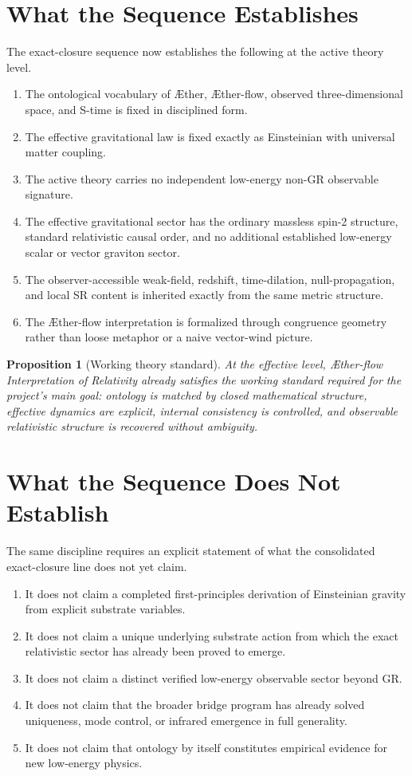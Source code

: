 \documentclass[11pt]{article}
\newcommand{\Aether}{\AE{}ther}
\newcommand{\Aflow}{\AE{}ther-flow}
\newcommand{\TheoryName}{\Aflow{} Interpretation of Relativity}
\newtheorem{proposition}{Proposition}
\begin{document}
\section{What the Sequence Establishes}

The exact-closure sequence now establishes the following at the active theory level.
\begin{enumerate}
    \item The ontological vocabulary of \Aether{}, \Aflow{}, observed three-dimensional space, and S-time is fixed in disciplined form.
    \item The effective gravitational law is fixed exactly as Einsteinian with universal matter coupling.
    \item The active theory carries no independent low-energy non-GR observable signature.
    \item The effective gravitational sector has the ordinary massless spin-2 structure, standard relativistic causal order, and no additional established low-energy scalar or vector graviton sector.
    \item The observer-accessible weak-field, redshift, time-dilation, null-propagation, and local SR content is inherited exactly from the same metric structure.
    \item The \Aflow{} interpretation is formalized through congruence geometry rather than loose metaphor or a naive vector-wind picture.
\end{enumerate}

\begin{proposition}[Working theory standard]
At the effective level, \TheoryName{} already satisfies the working standard required for the project's main goal: ontology is matched by closed mathematical structure, effective dynamics are explicit, internal consistency is controlled, and observable relativistic structure is recovered without ambiguity.
\end{proposition}

\section{What the Sequence Does Not Establish}

The same discipline requires an explicit statement of what the consolidated exact-closure line does not yet claim.
\begin{enumerate}
    \item It does not claim a completed first-principles derivation of Einsteinian gravity from explicit substrate variables.
    \item It does not claim a unique underlying substrate action from which the exact relativistic sector has already been proved to emerge.
    \item It does not claim a distinct verified low-energy observable sector beyond GR.
    \item It does not claim that the broader bridge program has already solved uniqueness, mode control, or infrared emergence in full generality.
    \item It does not claim that ontology by itself constitutes empirical evidence for new low-energy physics.
\end{enumerate}
\end{document}
